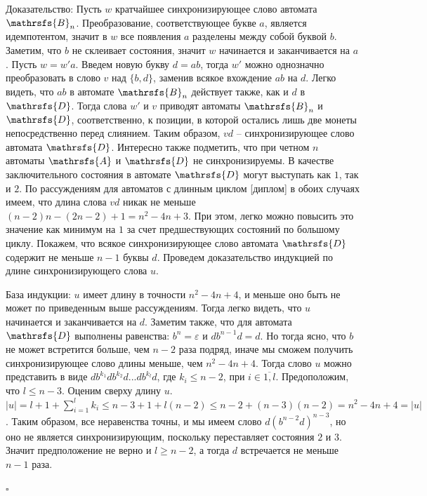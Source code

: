 \documentclass[11pt]{article}
\newenvironment{proof}{Доказательство:}{$\square$}
\begin{document}
\begin{proof}
Пусть $w$ кратчайшее синхронизирующее слово автомата $\mathrsfs{B}_n$.
Преобразование, соответствующее букве $a$, является идемпотентом,
значит в $w$ все появления $a$ разделены между собой буквой $b$. Заметим, что $b$ не склеивает состояния, значит
$w$ начинается и заканчивается на $a$. Пусть $w = w'a$.
Введем новую букву $d = ab$, тогда $w'$ можно однозначно преобразовать в слово $v$ над $\{b,d\}$, заменив всякое 
вхождение $ab$ на $d$. Легко видеть, что $ab$ в автомате $\mathrsfs{B}_n$ действует также, как и $d$ в $\mathrsfs{D}$.
Тогда слова $w'$ и $v$ приводят автоматы $\mathrsfs{B}_n$ и $\mathrsfs{D}$, соответственно, к позиции, в которой остались лишь две монеты
непосредственно перед слиянием. Таким образом, $vd$ -- синхронизирующее слово автомата $\mathrsfs{D}$. Интересно также подметить,
что при четном $n$ автоматы $\mathrsfs{A}$ и $\mathrsfs{D}$ не синхронизируемы.
В качестве заключительного состояния в автомате $\mathrsfs{D}$ могут выступать как $1$, так и $2$.
По рассуждениям для автоматов с длинным циклом [диплом] в обоих случаях имеем, что длина слова $vd$ никак не 
меньше $(n - 2)n - (2n - 2) + 1 = n^2 - 4n + 3$.
При этом, легко можно повысить это значение как минимум на $1$ за счет предшествующих состояний по большому циклу.
Покажем, что всякое синхронизирующее слово автомата $\mathrsfs{D}$ содержит не меньше $n - 1$ буквы $d$.
Проведем доказательство индукцией по длине синхронизирующего слова $u$.

База индукции: $u$ имеет длину в точности $n^2 - 4n + 4$, и меньше оно быть не может по приведенным выше рассуждениям.
Тогда легко видеть, что $u$ начинается и заканчивается на $d$. Заметим также, что для автомата $\mathrsfs{D}$ выполнены равенства:
$b^n = \varepsilon$ и $db^{n - 1}d = d$. Но тогда ясно, что $b$ не может встретится больше, чем $n - 2$ раза подряд, иначе мы 
сможем получить синхронизирующее слово длины меньше, чем $n^2 - 4n + 4$.
Тогда слово $u$ можно представить в виде $db^{k_1}db^{k_2}d...db^{k_l}d$, где $k_i \leq n - 2$, при $i \in \overline{1,l}$.
Предоположим, что $l \leq n - 3$.
Оценим сверху длину $u$. $|u| = l + 1 + \sum\limits_{i = 1}^{l}k_i \leq n - 3 + 1 + l(n - 2) \leq n - 2 + (n - 3)(n - 2) = n^2 - 4n + 4 = |u|$.
Таким образом, все неравенства точны, и мы имеем слово $d(b^{n - 2}d)^{n - 3}$, 
но оно не является синхронизирующим, поскольку переставляет состояния $2$ и $3$. Значит предположение не верно и $l \geq n - 2$,
а тогда $d$ встречается не меньше $n - 1$ раза.


\end{proof}
\end{document}
